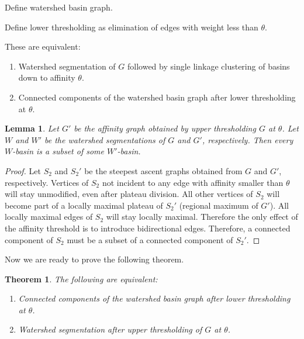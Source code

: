 \documentclass{article}
\newtheorem{lemma}{Lemma}
\newtheorem{theorem}{Theorem}
\begin{document}
Define watershed basin graph.

Define lower thresholding as elimination of edges with weight less than $\theta$. 

These are equivalent:
\begin{enumerate}
\item Watershed segmentation of $G$ followed by single linkage clustering of basins down to affinity $\theta$.
\item Connected components of the watershed basin graph after lower
  thresholding at $\theta$.
  \end{enumerate}

\begin{lemma}
  Let $G'$ be the affinity graph obtained by upper thresholding $G$ at
  $\theta$.  Let $W$ and $W'$ be the watershed segmentations of $G$
  and $G'$, respectively.  Then every $W$-basin is a subset of some
  $W'$-basin.
  \end{lemma}

\begin{proof}
Let $S_2$ and $S_2'$ be the steepest ascent graphs obtained from $G$
and $G'$, respectively.  Vertices of $S_2$ not incident to any edge
with affinity smaller than $\theta$ will stay unmodified, even after
plateau division. All other vertices of $S_2$ will become part of a
locally maximal plateau of $S_2'$ (regional maximum of $G'$). All
locally maximal edges of $S_2$ will stay locally maximal. Therefore
the only effect of the affinity threshold is to introduce
bidirectional edges. Therefore, a connected component of $S_2$ must 
be a subset of a connected component of $S_2'$.
\end{proof}

Now we are ready to prove the following theorem.
\begin{theorem}
The following are equivalent:
\begin{enumerate}
\item Connected components of the watershed basin graph after lower
  thresholding at $\theta$.
\item Watershed segmentation after upper thresholding of $G$ at $\theta$.
  \end{enumerate}
\end{theorem}
\end{document}
